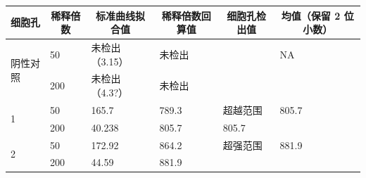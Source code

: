 \documentclass[UTF8,10pt,a4paper,fontset=fandol]{ctexart}
\newcommand{\handwritten}[1]{#1}
\begin{document}
\small
\begin{tabular}{|p{}|p{}|p{}|p{}|p{}|p{}|}
\hline
\multicolumn{1}{|c|}{细胞孔} &
\multicolumn{1}{c|}{稀释倍数} &
\multicolumn{1}{c|}{标准曲线拟合值} &
\multicolumn{1}{c|}{稀释倍数回算值} &
\multicolumn{1}{c|}{细胞孔检出值} &
\multicolumn{1}{c|}{均值（保留 2 位小数）}
\\ \hline
\multirow{2}{*}{阴性对照}
&
\handwritten{50}
&
\handwritten{未检出（3.15）}
&
\handwritten{未检出}
&
&
NA
\\ \cline{2-6}
&
\handwritten{200}
&
\handwritten{未检出（4.3?）}
&
\handwritten{未检出}
&
&
\\ \hline
\multirow{2}{*}{1}
&
\handwritten{50}
&
\handwritten{165.7}
&
\handwritten{789.3}
&
\handwritten{超越范围}
&
\handwritten{805.7}
\\ \cline{2-6}
&
\handwritten{200}
&
\handwritten{40.238}
&
\handwritten{805.7}
&
\handwritten{805.7}
&
\\ \hline
\multirow{2}{*}{2}
&
\handwritten{50}
&
\handwritten{172.92}
&
\handwritten{864.2}
&
\handwritten{超强范围}
&
\handwritten{881.9}
\\ \cline{2-6}
&
\handwritten{200}
&
\handwritten{44.59}
&
\handwritten{881.9}
&

\end{tabular}
\end{document}
